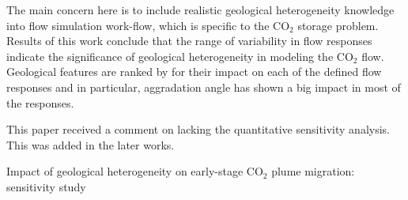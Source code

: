 {The main concern here is to include realistic geological heterogeneity knowledge
into flow simulation work-flow, which is specific to the $\mbox{CO}_2$ storage
problem. Results of this work conclude that the range of variability in flow
responses indicate the significance of geological heterogeneity in modeling the
$\mbox{CO}_2$ flow. Geological features are ranked by for their impact on each
of the defined flow responses and in particular, aggradation angle has shown a
big impact in most of the responses.

This paper received a comment on lacking the quantitative sensitivity analysis.
This was added in the later works. 

}%


%
%
{Impact of geological heterogeneity on early-stage $\mbox{CO}_2$ plume
migration: sensitivity study}
